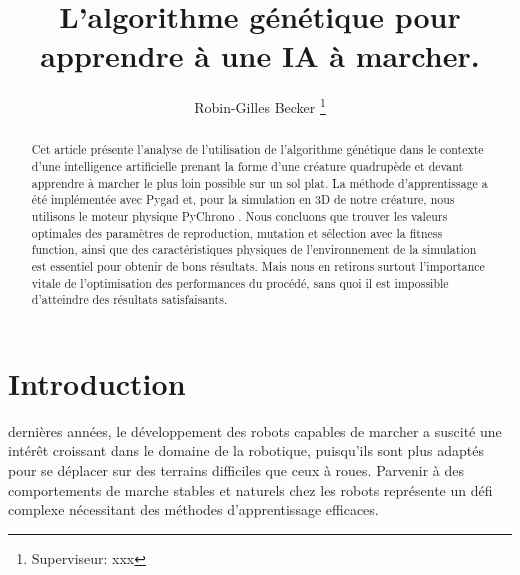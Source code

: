 \documentclass[journal, a4paper]{IEEEtran}
\begin{document}
	\title{L'algorithme génétique pour apprendre à une IA à marcher.}
	\author{Robin-Gilles Becker
	\thanks{Superviseur: xxx}}
	\maketitle

\begin{abstract}

	Cet article présente l'analyse de l'utilisation de l'algorithme génétique dans le contexte d'une intelligence artificielle prenant la forme d'une créature quadrupède et devant apprendre à marcher le plus loin possible sur un sol plat. La méthode d'apprentissage a été implémentée avec Pygad \cite{PyGad} et, pour la simulation en 3D de notre créature, nous utilisons le moteur physique PyChrono \cite{PyChrono}. Nous concluons que trouver les valeurs optimales des paramètres de reproduction, mutation et sélection avec la fitness function, ainsi que des caractéristiques physiques de l'environnement de la simulation est essentiel pour obtenir de bons résultats. Mais nous en retirons surtout l'importance vitale de l'optimisation des performances du procédé, sans quoi il est impossible d'atteindre des résultats satisfaisants.









 
\end{abstract}

\section{Introduction}

 dernières années, le développement des robots capables de marcher a suscité une intérêt croissant dans le domaine de la robotique, puisqu'ils sont plus adaptés pour se déplacer sur des terrains difficiles que ceux à roues. Parvenir à des comportements de marche stables et naturels chez les robots représente un défi complexe nécessitant des méthodes d'apprentissage efficaces.
\end{document}
